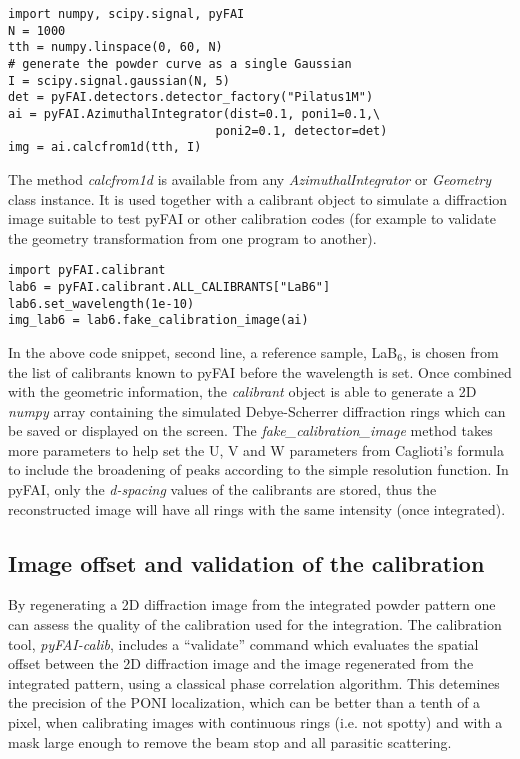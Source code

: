\documentclass{iucr}
\begin{document}
\begin{verbatim}
import numpy, scipy.signal, pyFAI
N = 1000 
tth = numpy.linspace(0, 60, N)
# generate the powder curve as a single Gaussian
I = scipy.signal.gaussian(N, 5)
det = pyFAI.detectors.detector_factory("Pilatus1M")
ai = pyFAI.AzimuthalIntegrator(dist=0.1, poni1=0.1,\
                             poni2=0.1, detector=det)
img = ai.calcfrom1d(tth, I)
\end{verbatim}


The method \textit{calcfrom1d} is available from any
\textit{AzimuthalIntegrator} or \textit{Geometry} class instance.
It is used together with a calibrant object to simulate a diffraction
image suitable to test pyFAI or other calibration codes (for example to
validate the geometry transformation from one program to another).



\begin{verbatim}
import pyFAI.calibrant
lab6 = pyFAI.calibrant.ALL_CALIBRANTS["LaB6"]
lab6.set_wavelength(1e-10)
img_lab6 = lab6.fake_calibration_image(ai)
\end{verbatim}

In the above code snippet, second line, a reference sample,
LaB$_6$, is chosen from the list of calibrants known to pyFAI before the
wavelength is set.
Once combined with the geometric information, the \textit{calibrant} object is
able to generate a 2D \textit{numpy} array containing the simulated Debye-Scherrer
diffraction rings which can be saved or displayed on the screen.
The \textit{fake\_calibration\_image} method takes more parameters to help set
the U, V and W parameters from Caglioti's formula \cite{caglioti} to include the
broadening of peaks according to the simple resolution function.
In pyFAI, only the \textit{d-spacing} values of the calibrants are stored, thus
the reconstructed image will have all rings with the same intensity (once integrated).

\subsection{Image offset and validation of the calibration}
By regenerating a 2D diffraction image from the integrated powder pattern one
can assess the quality of the calibration used for the integration.
The calibration tool, \textit{pyFAI-calib}, includes  a ``validate'' command
which evaluates the spatial offset between the 2D diffraction image and the
image regenerated from the integrated pattern, using a classical phase
correlation algorithm.
This detemines the precision of the PONI localization, which
can be better than a tenth of a pixel, when calibrating images with continuous
rings (i.e. not spotty) and with a mask large enough to remove the beam stop and
all parasitic scattering.
\end{document}

